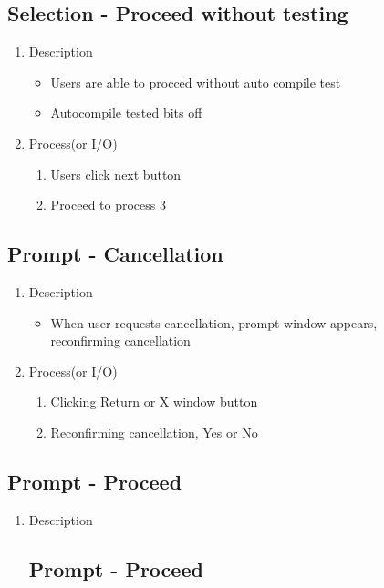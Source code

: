 \documentclass[conference]{IEEEtran}
\begin{document}
\begin{itemize}
\begin{itemize}
\begin{itemize}
\begin{itemize}
\begin{figure}[h]
\subsection{Selection - Proceed without testing}
\begin{enumerate}
  \item Description
  \begin{itemize}
    \item Users are able to procced without auto compile test
    \item Autocompile tested bits off
  \end{itemize}
  \item Process(or I/O)
  \begin{enumerate}
    \item Users click next button
    \item Proceed to process 3
  \end{enumerate}
\end{enumerate}
\textit{}


\subsection{Prompt - Cancellation}
\begin{enumerate}
  \item Description
  \begin{itemize}
    \item When user requests cancellation, prompt window appears, reconfirming cancellation
  \end{itemize}
  \item Process(or I/O)
  \begin{enumerate}
    \item Clicking Return or X window button
    \item Reconfirming cancellation, Yes or No
  \end{enumerate}
\end{enumerate}
\textit{}



\subsection{Prompt - Proceed}
\begin{enumerate}
  \item Description
  \begin{itemize}




\subsection{Prompt - Proceed}
\begin{enumerate}


\end{enumerate}
\end{itemize}
\end{enumerate}
\end{figure}
\end{itemize}
\end{itemize}
\end{itemize}
\end{itemize}
\end{document}
